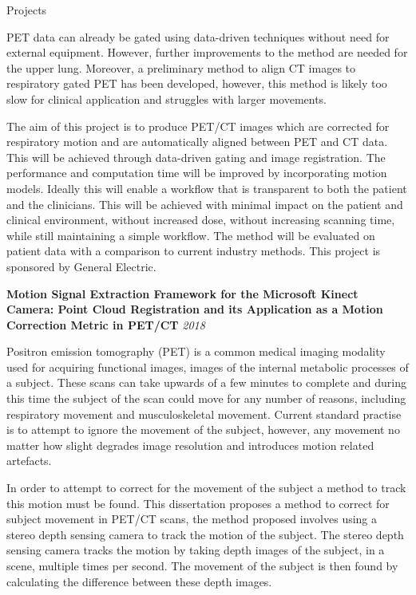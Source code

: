 \documentclass{cv}
\begin{document}
\begin{rSection}{Projects}
\item PET data can already be gated using data-driven techniques without need for external equipment. However, further improvements to the method are needed for the upper lung. Moreover, a preliminary method to align CT images to respiratory gated PET has been developed, however, this method is likely too slow for clinical application and struggles with larger movements.

\item The aim of this project is to produce PET/CT images which are corrected for respiratory motion and are automatically aligned between PET and CT data. This will be achieved through data-driven gating and image registration. The performance and computation time will be improved by incorporating motion models. Ideally this will enable a workflow that is transparent to both the patient and the clinicians. This will be achieved with minimal impact on the patient and clinical environment, without increased dose, without increasing scanning time, while still maintaining a simple workflow. The method will be evaluated on patient data with a comparison to current industry methods. This project is sponsored by General Electric.


{\bf Motion Signal Extraction Framework for the Microsoft Kinect Camera: Point Cloud Registration and its Application as a Motion Correction Metric in PET/CT} \hfill {\em 2018} 

\item Positron emission tomography (PET) is a common medical imaging modality used for acquiring functional images, images of the internal metabolic processes of a subject. These scans can take upwards of a few minutes to complete and during this time the subject of the scan could move for any number of reasons, including respiratory movement and musculoskeletal movement. Current standard practise is to attempt to ignore the movement of the subject, however, any movement no matter how slight degrades image resolution and introduces motion related artefacts.

\item In order to attempt to correct for the movement of the subject a method to track this motion must be found. This dissertation proposes a method to correct for subject movement in PET/CT scans, the method proposed involves using a stereo depth sensing camera to track the motion of the subject. The stereo depth sensing camera tracks the motion by taking depth images of the subject, in a scene, multiple times per second. The movement of the subject is then found by calculating the difference between these depth images.


\end{rSection}
\end{document}
